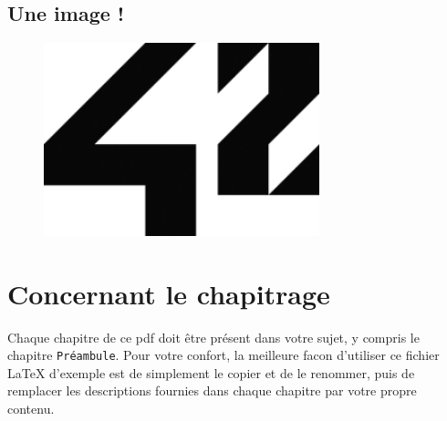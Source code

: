 \documentclass{42-fr}
\begin{document}


        \newpage


        \subsection{Une image !}

            \begin{figure}[H]
                \begin{center}
                    \includegraphics[width=8cm]{42.png}
                \end{center}
            \end{figure}


        \newpage




     \section{Concernant le chapitrage}

     Chaque chapitre de ce pdf doit \^etre pr\'esent dans votre sujet,
     y compris le chapitre \texttt{Pr\'eambule}. Pour votre confort,
     la meilleure facon d'utiliser ce fichier LaTeX d'exemple est de
     simplement le copier et de le renommer, puis de remplacer les
     descriptions fournies dans chaque chapitre par votre propre
     contenu.\\



\end{document}
